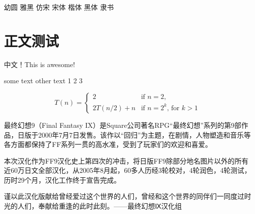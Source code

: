 \documentclass[12pt,a4paper]{article}
\begin{document}
{\YouYuan 幼圆}
{\YaHei 雅黑}
{\FangSong 仿宋}
{\SimSun 宋体}
{\KaiTi 楷体}
{\Hei 黑体}
{\LiShu 隶书}

\section{正文测试}

{\YouYuan 中文！}This is awesome!

{\MyTitle some text} {\FooBar other text 1 2 3} 


\begin{equation*}
T(n) = \left\{
  \begin{array}{ll}
    2         & \text{if $n=2$,}\\
    2T(n/2)+n & \text{if $n=2^k$, for $k>1$}
  \end{array}
\right.
\end{equation*}

{\YaHei 最终幻想9}（Final Fantasy IX）是Square公司著名RPG“最终幻想”系列的第9部作品，日版于2000年7月7日发售。该作以“回归”为主题，在剧情，人物塑造和音乐等各方面都保持了FF系列一贯的高水准，受到了玩家们的欢迎和喜爱。

本次汉化作为FF9汉化史上第四次的冲击，将日版FF9除部分地名图片以外的所有近60万日文全部汉化，从2005年8月起，60多人历经3轮校对，4轮润色，4轮测试，历时29个月，汉化工作终于宣告完成。

谨以此汉化版献给曾经爱过这个世界的人们，曾经和这个世界的同伴们一同度过时光的人们，奉献给重逢的此时此刻。——最终幻想Ⅸ汉化组
\end{document}
